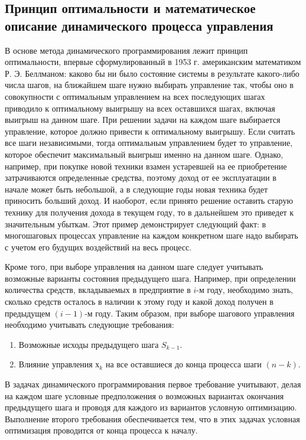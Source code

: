 \subsection{Принцип оптимальности и математическое описание динамического процесса управления}

В основе метода динамического программирования лежит принцип оптимальности, впервые сформулированный в 1953 г. американским математиком Р. Э. Беллманом: каково бы ни было состояние системы в результате какого-либо числа шагов, на ближайшем шаге нужно выбирать управление так, чтобы оно в совокупности с оптимальным управлением на всех последующих шагах приводило к оптимальному выигрышу на всех оставшихся шагах, включая выигрыш на данном шаге. При решении задачи на каждом шаге выбирается управление, которое должно привести к оптимальному выигрышу. Если считать все шаги независимыми, тогда оптимальным управлением будет то управление, которое обеспечит максимальный выигрыш именно на данном шаге. Однако, например, при покупке новой техники взамен устаревшей на ее приобретение затрачиваются определенные средства, поэтому доход от ее эксплуатации в начале может быть небольшой, а в следующие годы новая техника будет приносить больший доход. И наоборот, если принято решение оставить старую технику для получения дохода в текущем году, то в дальнейшем это приведет к значительным убыткам. Этот пример демонстрирует следующий факт: в многошаговых процессах управление на каждом конкретном шаге надо выбирать с учетом его будущих воздействий на весь процесс.

Кроме того, при выборе управления на данном шаге следует учитывать возможные варианты состояния предыдущего шага. Например, при определении количества средств, вкладываемых в предприятие в $i$-м году, необходимо знать, сколько средств осталось в наличии к этому году и какой доход получен в предыдущем $(i-1)$-м году. Таким образом, при выборе шагового управления необходимо учитывать следующие требования:

\begin{enumerate}
	\item Возможные исходы предыдущего шага $S_{k-1}$.
	\item Влияние управления $х_k$ на все оставшиеся до конца процесса шаги $(n - k)$.
\end{enumerate}

В задачах динамического программирования первое требование учитывают, делая на каждом шаге условные предположения о возможных вариантах окончания предыдущего шага и проводя для каждого из вариантов условную оптимизацию. Выполнение второго требования обеспечивается тем, что в этих задачах условная оптимизация проводится от конца процесса к началу.

